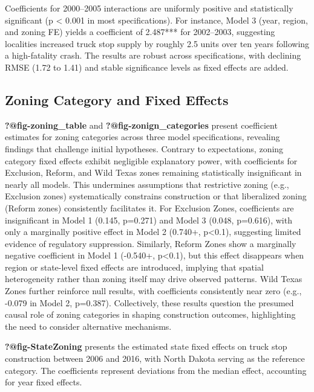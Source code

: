 \documentclass[
  8pt,
  12pt]{article}
\begin{document}
Coefficients for 2000--2005 interactions are uniformly positive and
statistically significant (p \textless{} 0.001 in most specifications).
For instance, Model 3 (year, region, and zoning FE) yields a coefficient
of 2.487*** for 2002--2003, suggesting localities increased truck stop
supply by roughly 2.5 units over ten years following a high-fatality
crash. The results are robust across specifications, with declining RMSE
(1.72 to 1.41) and stable significance levels as fixed effects are
added.

\subsection{Zoning Category and Fixed
Effects}\label{zoning-category-and-fixed-effects}

\textbf{?@fig-zoning\_table} and \textbf{?@fig-zonign\_categories}
present coefficient estimates for zoning categories across three model
specifications, revealing findings that challenge initial hypotheses.
Contrary to expectations, zoning category fixed effects exhibit
negligible explanatory power, with coefficients for Exclusion, Reform,
and Wild Texas zones remaining statistically insignificant in nearly all
models. This undermines assumptions that restrictive zoning (e.g.,
Exclusion zones) systematically constrains construction or that
liberalized zoning (Reform zones) consistently facilitates it. For
Exclusion Zones, coefficients are insignificant in Model 1 (0.145,
p=0.271) and Model 3 (0.048, p=0.616), with only a marginally positive
effect in Model 2 (0.740+, p\textless0.1), suggesting limited evidence
of regulatory suppression. Similarly, Reform Zones show a marginally
negative coefficient in Model 1 (-0.540+, p\textless0.1), but this
effect disappears when region or state-level fixed effects are
introduced, implying that spatial heterogeneity rather than zoning
itself may drive observed patterns. Wild Texas Zones further reinforce
null results, with coefficients consistently near zero (e.g., -0.079 in
Model 2, p=0.387). Collectively, these results question the presumed
causal role of zoning categories in shaping construction outcomes,
highlighting the need to consider alternative mechanisms.

\textbf{?@fig-StateZoning} presents the estimated state fixed effects on
truck stop construction between 2006 and 2016, with North Dakota serving
as the reference category. The coefficients represent deviations from
the median effect, accounting for year fixed effects.
\end{document}
